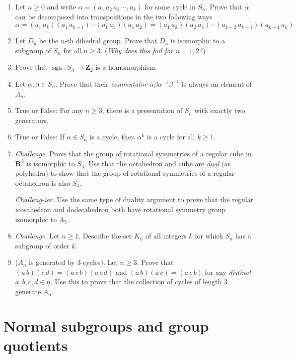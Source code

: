 \documentclass[12pt]{article}
\numberwithin{equation}{subsection}
\theoremstyle{note}
\begin{document}
\begin{enumerate}[label=\arabic*.]
	\item \label{permutation-ex} Let $n\geq 0$ and write $\alpha=(a_1\,a_2\,a_3\,\cdots,a_k)$ for some cycle in $S_n$. Prove that $\alpha$ can be decomposed into transpositions in the two following ways
	\[ \alpha=(a_1\,a_k)(a_1 \, a_{k-1})\cdots (a_1\,a_3)(a_1\,a_2)=(a_1\,a_2)(a_2\,a_3)\cdots(a_{k-2}\,a_{k-1})(a_{k-1}\,a_k)\]
	\item Let $D_n$ be the $n$-th dihedral group. Prove that $D_n$ is isomorphic to a subgroup of $S_n$ for all $n\geq 3$. (\textit{Why does this fail for $n=1,2$?}) 
	\item \label{sgn-hom}Prove that $\operatorname{sgn}\colon S_n\to\mathbf{Z}_2$ is a homomorphism. 
	\item Let $\alpha,\beta \in S_n$. Prove that their \textit{commutator} $\alpha\beta\alpha^{-1}\beta^{-1}$ is always an element of $A_n$.
	\item True or False: For any $n\geq 3$, there is a presentation of $S_n$ with exactly two generators. 
	\item True or False: If $\alpha\in S_n$ is a cycle, then $\alpha^k$ is a cycle for all $k\geq 1$.

	\item \textit{Challenge}. Prove that the group of rotational symmetries of a regular cube in $\mathbf{R}^3$ is isomorphic to $S_4$. Use that the octahedron and cube are \href{https://en.wikipedia.org/wiki/Dual_polyhedron}{\textit{dual}} (as polyhedra) to show that the group of rotational symmetries of a regular octahedron is also $S_4$. 
	
	\textit{Challeng-ier}. Use the same type of duality argument to prove that the regular icosahedron and dodecahedron both have rotational symmetry group isomorphic to $A_5$.
	\item \textit{Challenge}. Let $n\geq 1$. Describe the set $K_n$ of all integers $k$ for which $S_n$ has a subgroup of order $k$.
	\item ($A_n$ is generated by $3$-cycles). Let $n\geq 3$. Prove that $(a\,b)(c\,d)=(a\,c\,b)(a\,c\,d)$ and $(a\,b)(a\,c)=(a\,c\,b)$ for any \textit{distinct} $a,b,c,d\in \underline{n}$. Use this to prove that the collection of cycles of length $3$ generate $A_n$. 
\end{enumerate}

\section{Normal subgroups and group quotients}
\end{document}
